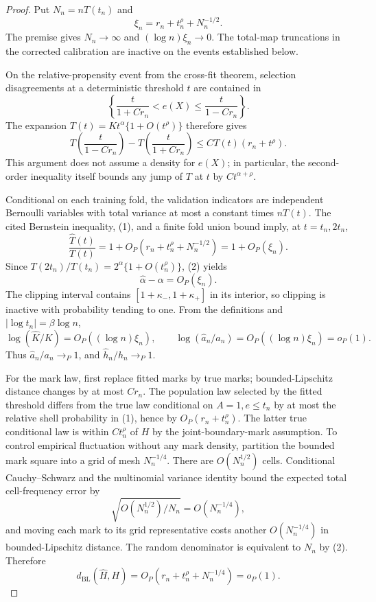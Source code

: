 \documentclass{article}
\begin{document}
\begin{proof}
Put \(N_n=nT(t_n)\) and
\[
 \xi_n=r_n+t_n^\rho+N_n^{-1/2}.
\]
The premise gives \(N_n\to\infty\) and \((\log n)\xi_n\to0\).  The total-map truncations in the corrected calibration are inactive on the events established below.

On the relative-propensity event from the cross-fit theorem, selection disagreements at a deterministic threshold \(t\) are contained in
\[
 \left\{\frac{t}{1+Cr_n}<e(X)\leq\frac{t}{1-Cr_n}\right\}.
\]
The expansion \(T(t)=Kt^\alpha\{1+O(t^\rho)\}\) therefore gives
\[
 T\!\left(\frac{t}{1-Cr_n}\right)-T\!\left(\frac{t}{1+Cr_n}\right)
 \leq CT(t)(r_n+t^\rho). \tag{1}
\]
This argument does not assume a density for \(e(X)\); in particular, the second-order inequality itself bounds any jump of \(T\) at \(t\) by \(Ct^{\alpha+\rho}\).

Conditional on each training fold, the validation indicators are independent Bernoulli variables with total variance at most a constant times \(nT(t)\).  The cited Bernstein inequality, (1), and a finite fold union bound imply, at \(t=t_n,2t_n\),
\[
 \frac{\widehat T(t)}{T(t)}=1+O_P(r_n+t_n^\rho+N_n^{-1/2})=1+O_P(\xi_n). \tag{2}
\]
Since \(T(2t_n)/T(t_n)=2^\alpha\{1+O(t_n^\rho)\}\), (2) yields
\[
 \widehat\alpha-\alpha=O_P(\xi_n). \tag{3}
\]
The clipping interval contains \([1+\kappa_-,1+\kappa_+]\) in its interior, so clipping is inactive with probability tending to one.  From the definitions and \(|\log t_n|=\beta\log n\),
\[
 \log(\widehat K/K)=O_P((\log n)\xi_n),\qquad
 \log(\widehat a_n/a_n)=O_P((\log n)\xi_n)=o_P(1). \tag{4}
\]
Thus \(\widehat a_n/a_n\to_P1\), and \(\widehat h_n/h_n\to_P1\).

For the mark law, first replace fitted marks by true marks; bounded-Lipschitz distance changes by at most \(Cr_n\).  The population law selected by the fitted threshold differs from the true law conditional on \(A=1,e\leq t_n\) by at most the relative shell probability in (1), hence by \(O_P(r_n+t_n^\rho)\).  The latter true conditional law is within \(C t_n^\rho\) of \(H\) by the joint-boundary-mark assumption.  To control empirical fluctuation without any mark density, partition the bounded mark square into a grid of mesh \(N_n^{-1/4}\).  There are \(O(N_n^{1/2})\) cells.  Conditional Cauchy--Schwarz and the multinomial variance identity bound the expected total cell-frequency error by
\[
 \sqrt{O(N_n^{1/2})/N_n}=O(N_n^{-1/4}),
\]
and moving each mark to its grid representative costs another \(O(N_n^{-1/4})\) in bounded-Lipschitz distance.  The random denominator is equivalent to \(N_n\) by (2).  Therefore
\[
 d_{\mathrm{BL}}(\widehat H,H)
 =O_P(r_n+t_n^\rho+N_n^{-1/4})=o_P(1). \tag{5}
\]


\end{proof}
\end{document}
